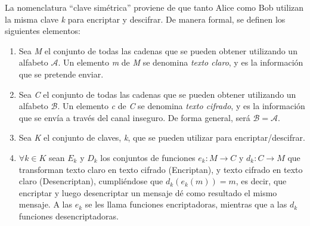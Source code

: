 La nomenclatura ``clave simétrica'' proviene de que tanto Alice como Bob utilizan la misma clave \textit{k} para encriptar y descifrar. De manera formal, se definen los siguientes elementos:
    \begin{enumerate}[label={--}]
        \item Sea \textit{M} el conjunto de todas las cadenas que se pueden obtener utilizando un alfabeto $\mathcal{A}$. Un elemento \textit{m} de \textit{M} se denomina \textit{texto claro}, y es la información que se pretende enviar.
        \item Sea \textit{C} el conjunto de todas las cadenas que se pueden obtener utilizando un alfabeto $\mathcal{B}$. Un elemento \textit{c} de \textit{C} se denomina \textit{texto cifrado}, y es la información que se envía a través del canal inseguro. De forma general, será $\mathcal{B} = \mathcal{A}$.
        \item Sea \textit{K} el conjunto de claves, \textit{k}, que se pueden utilizar para encriptar/descifrar.
        \item $\forall k\in K$ sean $E_k $ y $ D_k$ los conjuntos de funciones $e_k: M \to C$ y $d_k: C \to M$ que transforman texto claro en texto cifrado (Encriptan), y texto cifrado en texto claro (Desencriptan), cumpliéndose que $d_k(e_k(m)) = m$, es decir, que encriptar y luego desencriptar un mensaje dé como resultado el mismo mensaje. A las $e_k$ se les llama funciones encriptadoras, mientras que a las $d_k$ funciones desencriptadoras.
    \end{enumerate}

